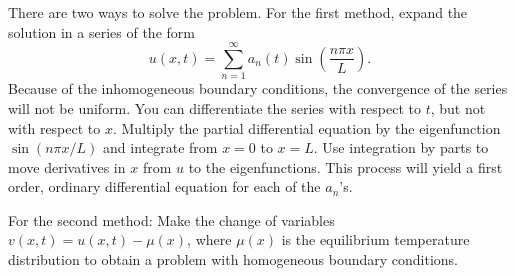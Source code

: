 {%
\begin{Hint}
  \label{hint normal modes drum unit radius}
\end{Hint}

\begin{Hint}
  \label{hint diffusion equation zero bc}
\end{Hint}


\begin{Hint}
  \label{hint diffusion nonzero bc}
  There are two ways to solve the problem.  For the first method, 
  expand the solution in a series of the form
  \[
  u(x,t) = \sum_{n=1}^\infty a_n(t) \sin \left( \frac{n \pi x}{L} \right).
  \]
  Because of the inhomogeneous boundary conditions, the convergence of 
  the series will not be uniform.  You can differentiate the series with
  respect to $t$, but not with respect to $x$.  Multiply the partial
  differential equation by the eigenfunction $\sin(n \pi x / L)$ and 
  integrate from $x=0$ to $x=L$.  Use integration by parts to move derivatives
  in $x$ from $u$ to the eigenfunctions.  This process will yield a 
  first order, ordinary differential equation for each of the $a_n$'s.

  For the second method:
  Make the change of variables $v(x,t) = u(x,t) - \mu(x)$, where $\mu(x)$
  is the equilibrium temperature distribution to obtain a problem with 
  homogeneous boundary conditions.  
\end{Hint}



\begin{Hint}
  \label{hint pt=a2pxx+w p=0 px=0}
\end{Hint}





\begin{Hint}
  \label{hint heat p=0 cp+px=0}
\end{Hint}





\begin{Hint}
  \label{hint heat p=t px=-cp}
\end{Hint}






}
